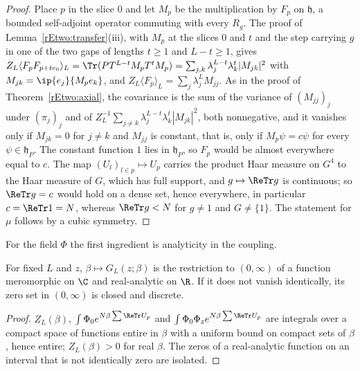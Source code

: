 \begin{proof}
Place $p$ in the slice $0$ and let $M_p$ be the multiplication by $F_p$
on $\mathfrak h$, a bounded self-adjoint operator commuting with every
$R_g$. The proof of Lemma~\ref{rEtwo:transfer}(iii), with $M_p$ at the
slices $0$ and $t$ and the step carrying $g$ in one of the two gaps of
lengths $t\ge1$ and $L-t\ge1$, gives $Z_L\langle F_pF_{p+te_0}\rangle_L=
\Tr(PT^{L-t}M_pT^tM_p)=\sum_{j,k}\lambda_j^{L-t}\lambda_k^t|M_{jk}|^2$ with
$M_{jk}=\ip{e_j}{M_pe_k}$, and $Z_L\langle F_p\rangle_L=\sum_j\lambda_j^L
M_{jj}$. As in the proof of Theorem~\ref{rEtwo:axial}, the covariance is
the sum of the variance of $(M_{jj})_j$ under $(\pi_j)_j$ and of
$Z_L^{-1}\sum_{j\ne k}\lambda_j^{L-t}\lambda_k^t|M_{jk}|^2$, both
nonnegative, and it vanishes only if $M_{jk}=0$ for $j\ne k$ and $M_{jj}$
is constant, that is, only if $M_p\psi=c\psi$ for every $\psi\in\mathfrak
h_P$. The constant function $1$ lies in $\mathfrak h_P$, so $F_p$ would be
almost everywhere equal to $c$. The map $(U_l)_{l\in p}\mapsto U_p$
carries the product Haar measure on $G^4$ to the Haar measure of $G$,
which has full support, and $g\mapsto\ReTr g$ is continuous; so $\ReTr g=c$
would hold on a dense set, hence everywhere, in particular $c=\ReTr1=N$,
whereas $\ReTr g<N$ for $g\ne1$ and $G\ne\{1\}$. The statement for $\mu$
follows by a cubic symmetry.
\end{proof}

For the field $\Phi$ the first ingredient is analyticity in the coupling.

\begin{lemma}\label{rEtwo:analytic}
For fixed $L$ and $z$, $\beta\mapsto G_L(z;\beta)$ is the restriction to
$(0,\infty)$ of a function meromorphic on $\C$ and real-analytic on
$\R$. If it does not vanish identically, its zero set in $(0,\infty)$ is
closed and discrete.
\end{lemma}

\begin{proof}
$Z_L(\beta)$, $\int\Phi_0e^{N\beta\sum\ReTr U_p}$ and $\int\Phi_0\Phi_ze^{
N\beta\sum\ReTr U_p}$ are integrals over a compact space of functions
entire in $\beta$ with a uniform bound on compact sets of $\beta$, hence
entire; $Z_L(\beta)>0$ for real $\beta$. The zeros of a real-analytic
function on an interval that is not identically zero are isolated.
\end{proof}

